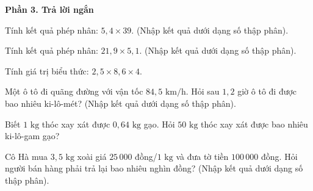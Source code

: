 \textbf{Phần 3. Trả lời ngắn}

\begin{ex} %
Tính kết quả phép nhân: $5{,}4 \times 39$. (Nhập kết quả dưới dạng số thập phân).
\end{ex}

\begin{ex} %
Tính kết quả phép nhân: $21{,}9 \times 5{,}1$. (Nhập kết quả dưới dạng số thập phân).
\end{ex}

\begin{ex} %
Tính giá trị biểu thức: $2{,}5 \times 8{,}6 \times 4$.
\end{ex}

\begin{ex} %
Một ô tô đi quãng đường với vận tốc $84{,}5\text{ km/h}$. Hỏi sau $1{,}2$ giờ ô tô đi được bao nhiêu ki-lô-mét? (Nhập kết quả dưới dạng số thập phân).
\end{ex}

\begin{ex} %
Biết $1\text{ kg}$ thóc xay xát được $0{,}64\text{ kg}$ gạo. Hỏi $50\text{ kg}$ thóc xay xát được bao nhiêu ki-lô-gam gạo?
\end{ex}

\begin{ex} %
Cô Hà mua $3{,}5\text{ kg}$ xoài giá $25\,000$ đồng/$1\text{ kg}$ và đưa tờ tiền $100\,000$ đồng. Hỏi người bán hàng phải trả lại bao nhiêu nghìn đồng? (Nhập kết quả dưới dạng số thập phân).
\end{ex}
